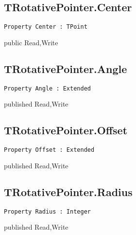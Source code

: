 \subsection{TRotativePointer.Center}
\label{hmi:drawncontrol:trotativepointer:center}
\begin{FPCList}
\Declaration 

\begin{verbatim}
Property Center : TPoint
\end{verbatim}
\Visibility
public
\Access
Read,Write
\end{FPCList}
\subsection{TRotativePointer.Angle}
\label{hmi:drawncontrol:trotativepointer:angle}
\begin{FPCList}
\Declaration 

\begin{verbatim}
Property Angle : Extended
\end{verbatim}
\Visibility
published
\Access
Read,Write
\end{FPCList}
\subsection{TRotativePointer.Offset}
\label{hmi:drawncontrol:trotativepointer:offset}
\begin{FPCList}
\Declaration 

\begin{verbatim}
Property Offset : Extended
\end{verbatim}
\Visibility
published
\Access
Read,Write
\end{FPCList}
\subsection{TRotativePointer.Radius}
\label{hmi:drawncontrol:trotativepointer:radius}
\begin{FPCList}
\Declaration 

\begin{verbatim}
Property Radius : Integer
\end{verbatim}
\Visibility
published
\Access
Read,Write
\end{FPCList}
